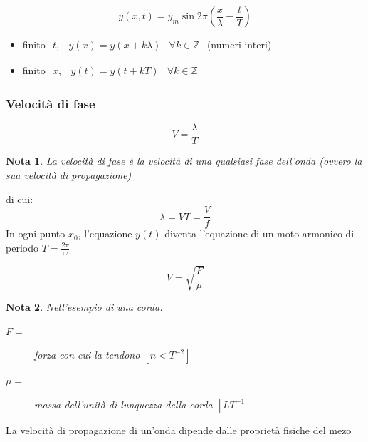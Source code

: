 \documentclass{book}
\newtheorem{nota}{Nota}[section]
\begin{document}
\begin{equation}
  \label{eq:teoonde}
  y(x,t)=y_m\sin2\pi\left(\frac{x}{\lambda}-\frac{t}{T}\right)
\end{equation}
\begin{itemize}
\item finito $
  \begin{matrix}
    t, & y(x)=y(x+k\lambda) & \forall k\in \mathds{Z}
  \end{matrix}
  $ (numeri interi)
\item finito $
  \begin{matrix}
    x, & y(t)=y(t+kT) & \forall k \in \mathds{Z} 
  \end{matrix}
  $
\end{itemize}
\begin{multicols}{2}
  \subsubsection{Velocità di fase}
  \label{sec:velfase}
  \begin{equation}
    \label{eq:velfase}
    V=\frac{\lambda}{T}
  \end{equation}
  \begin{nota}
    La velocità di fase è la velocità di una qualsiasi fase dell'onda ({\color{red}ovvero la sua velocità di propagazione})
  \end{nota}
\end{multicols}
di cui:
\begin{equation*}
  \lambda=VT=\frac{V}{f}
\end{equation*}
In ogni punto $x_0$, l'equazione $y(t)$ diventa l'equazione di un moto armonico di periodo $T=\frac{2\pi}{\omega}$
\begin{multicols}{2}
  \begin{equation*}
    V=\sqrt{\frac{F}{\mu}}
  \end{equation*}
  \begin{nota}
    Nell'esempio di una corda:
    \begin{description}
    \item[$F=$] forza con cui la tendono $\left[n<T^{-2}\right]$
    \item[$\mu=$] massa dell'unità di lunquezza della corda $\left[LT^{-1}\right]$
    \end{description}
  \end{nota}
\end{multicols}
La velocità di propagazione di un'onda dipende dalle proprietà fisiche del mezo
\end{document}
